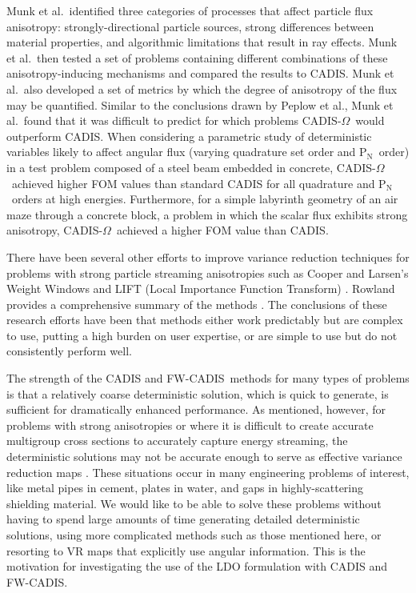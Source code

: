 \documentclass{article} %
\newcommand{\pn}{P$_\mathrm{N}$}
\newcommand{\fwc}{\mbox{FW-CADIS}}
\newcommand{\co}{\mbox{CADIS-$\Omega$}}
\begin{document}
Munk et al.\ identified three categories
of processes that affect particle flux anisotropy: strongly-directional
particle sources, strong differences between material properties, and
algorithmic limitations that result in ray effects. Munk et al.\ then tested a
set of problems containing different combinations of these anisotropy-inducing
mechanisms and compared the results to CADIS. Munk et al.\ also developed a
set of metrics by which the degree of anisotropy of the flux may be
quantified. Similar to the conclusions drawn by Peplow et al., Munk et al.\
found that it was difficult to predict for which problems \co\ would
outperform CADIS. When considering a parametric study of deterministic
variables likely to affect angular flux (varying quadrature set order and \pn\
order) in a test problem composed of a steel beam embedded in concrete, \co\
achieved higher FOM values than standard CADIS for all quadrature and \pn\
orders at high energies. Furthermore, for a simple labyrinth geometry of an air
maze through a concrete block, a problem in which the scalar flux exhibits strong
anisotropy, \co\ achieved a higher FOM value than CADIS.

There have been several other efforts to improve variance reduction techniques
for problems with strong particle streaming anisotropies such as Cooper and
Larsen's Weight Windows \cite{clww} and LIFT (Local Importance Function
Transform) \cite{lift1, lift2}. Rowland provides a comprehensive summary of the
methods \cite{kr}. The conclusions of these research efforts have
been that methods either work predictably but are complex to use, putting a
high burden on user expertise, or are simple to use but do not consistently
perform well.

The strength of the CADIS and \fwc\ methods for many types of problems is that a
relatively coarse deterministic solution, which is quick to generate, is
sufficient for dramatically enhanced performance. As mentioned, however, for
problems with strong anisotropies or where it is difficult to create accurate
multigroup cross sections to accurately capture energy streaming, the
deterministic solutions may not be accurate enough to serve as effective
variance reduction maps \cite{wilsonslaybaugh,peplow}. These situations occur in
many engineering problems of interest, like metal pipes in cement, plates in
water, and gaps in highly-scattering shielding material. We would like to be
able to solve these problems without having to spend large amounts of time
generating detailed deterministic solutions, using more complicated methods such
as those mentioned here, or resorting to VR maps that explicitly use angular
information. This is the motivation for investigating the use of the LDO
formulation with CADIS and \fwc.
\end{document}

